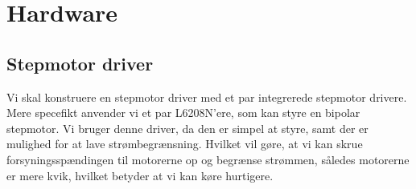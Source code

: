 \chapter[Implementering af hardware]{Hardware}


\section{Stepmotor driver}
\label{sc:stepmotor-driver}
Vi skal konstruere en
stepmotor driver med et par integrerede stepmotor drivere. Mere
specefikt anvender vi et par L6208N'ere, som kan styre en bipolar
stepmotor. Vi bruger denne driver, da den er simpel at styre, samt der
er mulighed for at lave strømbegrænsning. Hvilket vil gøre, at vi kan
skrue forsyningsspændingen til motorerne op og begrænse strømmen,
således motorerne er mere kvik, hvilket betyder at vi kan køre
hurtigere.



